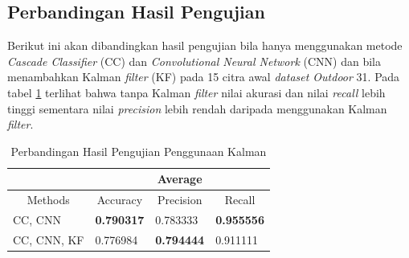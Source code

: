 \subsection{Perbandingan Hasil Pengujian}
\noindent Berikut ini akan dibandingkan hasil pengujian bila hanya menggunakan metode \textit{Cascade Classifier} (CC) dan \textit{Convolutional Neural Network} (CNN) dan bila menambahkan Kalman \textit{filter} (KF) pada 15 citra awal \textit{dataset Outdoor} 31. Pada tabel \ref{tbl:HasilUjiPenggunaanKalman} terlihat bahwa tanpa Kalman \textit{filter} nilai akurasi dan nilai \textit{recall} lebih tinggi sementara nilai \textit{precision} lebih rendah daripada menggunakan Kalman \textit{filter}.
\begin{table}[H]
\centering
\caption{Perbandingan Hasil Pengujian Penggunaan Kalman}
\label{tbl:HasilUjiPenggunaanKalman}
\begin{small}
\begin{tabular}{l|l|l|l|}
\cline{2-4}
                                  & \multicolumn{3}{c|}{Average}                                                                 \\ \hline
\multicolumn{1}{|c|}{Methods}     & \multicolumn{1}{c|}{Accuracy} & \multicolumn{1}{c|}{Precision} & \multicolumn{1}{c|}{Recall} \\ \hline
\multicolumn{1}{|l|}{CC, CNN}     & \textbf{0.790317}             & 0.783333                       & \textbf{0.955556}           \\ \hline
\multicolumn{1}{|l|}{CC, CNN, KF} & 0.776984                      & \textbf{0.794444}              & 0.911111                    \\ \hline
\end{tabular}
\end{small}
\end{table}

